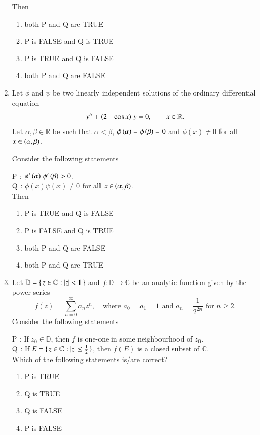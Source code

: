 \documentclass[journal,12pt,onecolumn]{IEEEtran}
\theoremstyle{remark}
\begin{document}
\begin{enumerate}[start=1, label=Q.\arabic*]
Then
\begin{enumerate}
\item both P and Q are TRUE
\item P is FALSE and Q is TRUE
\item P is TRUE and Q is FALSE
\item both P and Q are FALSE
\end{enumerate}

\hfill{}


\item Let $\phi$ and $\psi$ be two linearly independent solutions of the ordinary differential equation
\[
y''+\left(2-\cos x\right)\,y=0,\qquad x\in \mathbb{R}.
\]
Let $\alpha,\beta\in \mathbb{R}$ be such that $\alpha<\beta$, $\phi\left(\alpha\right)=\phi\left(\beta\right)=0$ and $\phi(x)\ne 0$ for all $x\in \left(\alpha,\beta\right)$.  

Consider the following statements\brak{:}

P : $\phi'\left(\alpha\right)\,\phi'\left(\beta\right)>0$.\\
Q : $\phi(x)\psi(x)\ne 0$ for all $x\in \left(\alpha,\beta\right)$.\\

Then
\begin{enumerate}
\item P is TRUE and Q is FALSE
\item P is FALSE and Q is TRUE
\item both P and Q are FALSE
\item both P and Q are TRUE
\end{enumerate}

\hfill{}

\item Let $\mathbb{D}=\{\, z\in \mathbb{C} : \left\vert z\right\vert<1 \,\}$ and $f: \mathbb{D}\to \mathbb{C}$ be an analytic function given by the power series
\[
f(z)=\sum_{n=0}^{\infty} a_{n} z^{n}, \quad \text{where } a_{0}=a_{1}=1 \text{ and } a_{n}=\frac{1}{2^{2n}} \text{ for } n\ge 2.
\]
Consider the following statements\brak{:}

P : If $z_{0}\in \mathbb{D}$, then $f$ is one\mbox{-}one in some neighbourhood of $z_{0}$.\\
Q : If $E=\{\, z\in \mathbb{C} : \left\vert z\right\vert\le \tfrac{1}{2} \,\}$, then $f(E)$ is a closed subset of $\mathbb{C}$.\\

Which of the following statements is/are correct?
\begin{enumerate}
\item P is TRUE
\item Q is TRUE
\item Q is FALSE
\item P is FALSE
\end{enumerate}


\end{enumerate}
\end{document}
